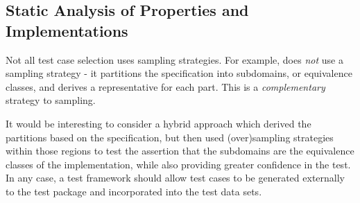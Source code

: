 \subsection{Static Analysis of Properties and Implementations}

Not all test case selection uses sampling strategies.
For example, \HOLTG does \emph{not} use a sampling strategy -
it partitions the specification into subdomains, or equivalence classes,
and derives a representative for each part.
This is a \emph{complementary} strategy to sampling.

It would be interesting to consider a hybrid approach which
derived the partitions based on the specification,
but then used (over)sampling strategies within those regions to
test the assertion that the subdomains are the equivalence classes of
the implementation, while also providing greater confidence in the test.
In any case, a test framework should allow test cases to be generated
externally to the test package and incorporated into the test data sets.

